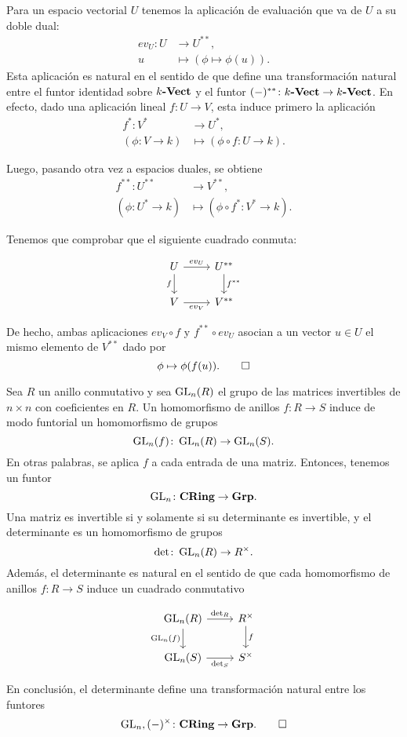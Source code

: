 \documentclass{article}
\numberwithin{equation}{section}
\theoremstyle{definition}
\begin{document}
\begin{ejemplo}
  Para un espacio vectorial $U$ tenemos la aplicación de evaluación que va de
  $U$ a su doble dual:
  \begin{align*}
    ev_U\colon U & \to U^{**},\\
    u & \mapsto (\phi \mapsto \phi (u)).
  \end{align*}
  Esta aplicación es natural en el sentido de que define una transformación
  natural entre el funtor identidad sobre $k\text{\bf -Vect}$ y el funtor
  $(-)^{**}\colon k\text{\bf -Vect}\to k\text{\bf -Vect}$. En efecto, dado una
  aplicación lineal $f\colon U\to V$, esta induce primero la aplicación
  \begin{align*}
    f^*\colon V^* & \to U^*,\\
    (\phi\colon V\to k) & \mapsto (\phi\circ f\colon U\to k).
  \end{align*}

  Luego, pasando otra vez a espacios duales, se obtiene
  \begin{align*}
    f^{**}\colon U^{**} & \to V^{**},\\
    (\phi\colon U^* \to k) & \mapsto (\phi\circ f^*\colon V^*\to k).
  \end{align*}

  Tenemos que comprobar que el siguiente cuadrado conmuta:

  \[ \begin{tikzcd}
      U\ar{d}[swap]{f}\ar{r}{ev_U} & U^{**}\ar{d}{f^{**}} \\
      V\ar{r}[swap]{ev_V} & V^{**}
    \end{tikzcd} \]

  De hecho, ambas aplicaciones $ev_V\circ f$ y $f^{**}\circ ev_U$ asocian a un
  vector $u\in U$ el mismo elemento de $V^{**}$ dado por
  \[ \phi \mapsto \phi (f (u)). \qedhere \]
\end{ejemplo}

\begin{ejemplo}
  Sea $R$ un anillo conmutativo y sea $\operatorname{GL}_n (R)$ el grupo de las matrices
  invertibles de $n\times n$ con coeficientes en $R$. Un homomorfismo de anillos
  $f\colon R\to S$ induce de modo funtorial un homomorfismo de grupos
  $$\operatorname{GL}_n (f)\colon \operatorname{GL}_n (R)\to \operatorname{GL}_n (S).$$
  En otras palabras, se aplica $f$ a cada entrada de una matriz. Entonces,
  tenemos un funtor
  $$\operatorname{GL}_n\colon \text{\bf CRing} \to \text{\bf Grp}.$$
  Una matriz es invertible si y solamente si su determinante es invertible, y el
  determinante es un homomorfismo de grupos
  $$\det\colon \operatorname{GL}_n (R) \to R^\times.$$
  Además, el determinante es natural en el sentido de que cada homomorfismo de
  anillos $f\colon R\to S$ induce un cuadrado conmutativo

  \[ \begin{tikzcd}
      \GL_n (R)\ar{d}[swap]{\GL_n (f)}\ar{r}{\det_R} & R^\times\ar{d}{f} \\
      \GL_n (S)\ar{r}[swap]{\det_S} & S^\times
    \end{tikzcd} \]

  En conclusión, el determinante define una transformación natural entre los
  funtores
  \[ \operatorname{GL}_n, (-)^\times\colon \text{\bf CRing} \to \text{\bf Grp}. \qedhere \]
\end{ejemplo}
\end{document}
